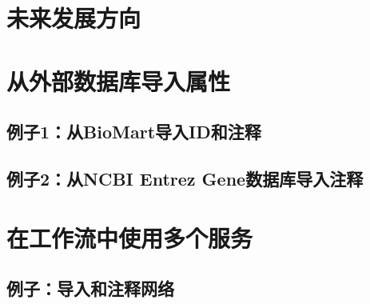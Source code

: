 \section{未来发展方向}

\section{从外部数据库导入属性}
\subsection{例子1：从BioMart导入ID和注释}
\subsection{例子2：从NCBI Entrez Gene数据库导入注释}

\section{在工作流中使用多个服务}
\subsection{例子：导入和注释网络}

